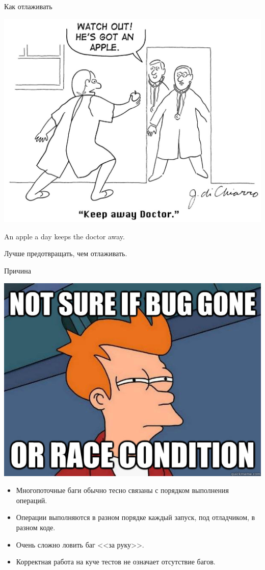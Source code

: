 \begin{frame}{Как отлаживать}
	\begin{center}
		\includegraphics[scale=0.2]{apple-a-day.jpg}
		\pause

		An apple a day keeps the doctor away.

		Лучше предотвращать, чем отлаживать.
	\end{center}
\end{frame}

\begin{frame}{Причина}
	\begin{center}
		\includegraphics[scale=0.2]{race-or-bug.jpg}
	\end{center}
	\begin{itemize}
		\item Многопоточные баги обычно тесно связаны с порядком выполнения операций.
		\item Операции выполняются в разном порядке каждый запуск, под отладчиком, в разном коде.
		\item Очень сложно ловить баг <<за руку>>.
		\item Корректная работа на куче тестов не означает отсутствие багов.
	\end{itemize}
\end{frame}

